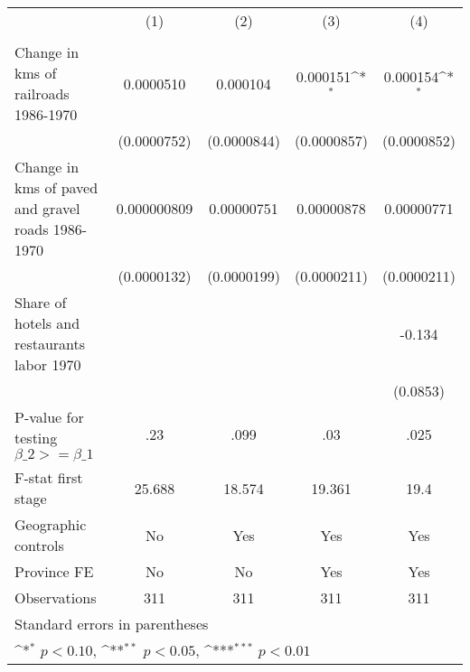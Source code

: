 {
\def\sym#1{\ifmmode^{#1}\else\(^{#1}\)\fi}
\begin{tabular}{l*{4}{c}}
\hline\hline
                &\multicolumn{1}{c}{(1)}&\multicolumn{1}{c}{(2)}&\multicolumn{1}{c}{(3)}&\multicolumn{1}{c}{(4)}\\
                &\multicolumn{1}{c}{}&\multicolumn{1}{c}{}&\multicolumn{1}{c}{}&\multicolumn{1}{c}{}\\
\hline
Change in kms of railroads 1986-1970&0.0000510         & 0.000104         & 0.000151\sym{*}  & 0.000154\sym{*}  \\
                &(0.0000752)         &(0.0000844)         &(0.0000857)         &(0.0000852)         \\
[1em]
Change in kms of paved and gravel roads 1986-1970&0.000000809         &0.00000751         &0.00000878         &0.00000771         \\
                &(0.0000132)         &(0.0000199)         &(0.0000211)         &(0.0000211)         \\
[1em]
Share of hotels and restaurants labor 1970&                  &                  &                  &   -0.134         \\
                &                  &                  &                  & (0.0853)         \\
\hline
P-value for testing $\beta\_{2} >= \beta\_{1}$&      .23         &     .099         &      .03         &     .025         \\
F-stat first stage&   25.688         &   18.574         &   19.361         &     19.4         \\
Geographic controls&       No         &      Yes         &      Yes         &      Yes         \\
Province FE     &       No         &       No         &      Yes         &      Yes         \\
Observations    &      311         &      311         &      311         &      311         \\
\hline\hline
\multicolumn{5}{l}{\footnotesize Standard errors in parentheses}\\
\multicolumn{5}{l}{\footnotesize \sym{*} \(p<0.10\), \sym{**} \(p<0.05\), \sym{***} \(p<0.01\)}\\
\end{tabular}
}
